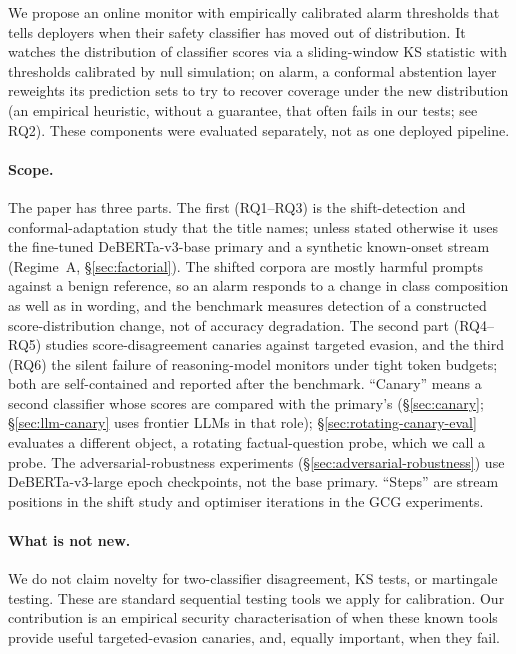 \documentclass{article}
\begin{document}
We propose an online monitor with empirically calibrated alarm thresholds that tells deployers when their safety classifier has moved out of distribution. It watches the distribution of classifier scores via a sliding-window KS statistic with thresholds calibrated by null simulation; on alarm, a conformal abstention layer reweights its prediction sets to try to recover coverage under the new distribution (an empirical heuristic, without a guarantee, that often fails in our tests; see RQ2). These components were evaluated separately, not as one deployed pipeline.

\paragraph{Scope.} The paper has three parts. The first (RQ1--RQ3) is the shift-detection and conformal-adaptation study that the title names; unless stated otherwise it uses the fine-tuned DeBERTa-v3-base primary and a synthetic known-onset stream (Regime~A, \S\ref{sec:factorial}). The shifted corpora are mostly harmful prompts against a benign reference, so an alarm responds to a change in class composition as well as in wording, and the benchmark measures detection of a constructed score-distribution change, not of accuracy degradation. The second part (RQ4--RQ5) studies score-disagreement canaries against targeted evasion, and the third (RQ6) the silent failure of reasoning-model monitors under tight token budgets; both are self-contained and reported after the benchmark. ``Canary'' means a second classifier whose scores are compared with the primary's (\S\ref{sec:canary}; \S\ref{sec:llm-canary} uses frontier LLMs in that role); \S\ref{sec:rotating-canary-eval} evaluates a different object, a rotating factual-question probe, which we call a probe. The adversarial-robustness experiments (\S\ref{sec:adversarial-robustness}) use DeBERTa-v3-large epoch checkpoints, not the base primary. ``Steps'' are stream positions in the shift study and optimiser iterations in the GCG experiments.

\paragraph{What is not new.} We do not claim novelty for two-classifier disagreement, KS tests, or martingale testing. These are standard sequential testing tools we apply for calibration. Our contribution is an empirical security characterisation of when these known tools provide useful targeted-evasion canaries, and, equally important, when they fail.
\end{document}
